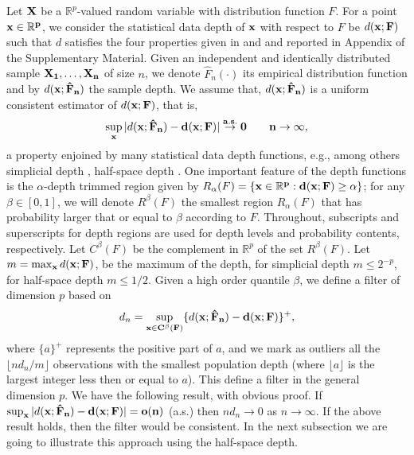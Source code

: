 \documentclass[a4paper,12pt]{article}
\begin{document}
Let $\bf{X}$ be a $\mathbb{R}^p$-valued random variable with distribution function $F$. For a point $\bf{x} \in \mathbb{R}^p$, we consider the statistical data depth of $\bf{x}$ with respect to $F$ be $d(\bf{x};F)$ such that $d$ satisfies the four properties given in \citet{Liu1990} and \citet{Zuo2000a} and reported in Appendix  of the Supplementary Material. Given an independent and identically distributed sample $\bf{X}_1, \ldots, \bf{X}_n$ of size $n$, we denote $\hat{F}_n(\cdot)$ its empirical distribution function and by $d(\bf{x}; \hat{F}_n)$ the sample depth. We assume that, $d(\bf{x}; \hat{F}_n)$ is a uniform consistent estimator of $d(\bf{x}; F)$, that is, 
\begin{equation*}
\sup_{\bf{x}}| d(\bf{x}; \hat{F}_n) - d(\bf{x}; F) | \stackrel{a.s.}{\rightarrow} 0 \qquad n \rightarrow \infty ,
\end{equation*}
a property enjoined by many statistical data depth functions, e.g., among others simplicial depth \citep{Liu1990}, half-space depth \citep{Tukey1975}. One important feature of the depth functions is the $\alpha$-depth trimmed region given by $R_\alpha(F) = \{ \bf{x} \in \mathbb{R}^p: d(\bf{x}; F) \ge \alpha\}$; for any $\beta \in [0,1]$, we will denote $R^\beta(F)$ the smallest region $R_\alpha(F)$ that has probability larger that or equal to $\beta$ according to $F$. Throughout, subscripts and superscripts for depth regions are used for depth levels and probability contents, respectively. Let $C^\beta(F)$ be the complement in $\mathbb{R}^p$ of the set $R^\beta(F)$. Let $m = \max_{\bf{x}} d(\bf{x};F)$, be the maximum of the depth, for simplicial depth $m \le 2^{-p}$, for half-space depth $m \le 1/2$.
Given a high order quantile $\beta$, we define a filter of dimension $p$ based on
\begin{equation}
d_n = \sup_{\bf{x} \in C^\beta(F)} \{ d(\bf{x}; \hat{F}_n) - d(\bf{x}; F) \}^+ ,
\end{equation}
where $\{a\}^+$ represents the positive part of $a$, and we mark as outliers all the $\lfloor n d_n/m \rfloor$ observations with the smallest population depth (where $\lfloor a \rfloor$ is the largest integer less then or equal to $a$). This define a filter in the general dimension $p$.
We have the following result, with obvious proof.
If $\sup_{\bf{x}}| d(\bf{x}; \hat{F}_n) - d(\bf{x}; F) | = o(n)$ (a.s.) then $n d_n \rightarrow 0$ as $n \rightarrow \infty$.
If the above result holds, then the filter would be consistent. In the next subsection we are going to illustrate this approach using the half-space depth.
\end{document}
